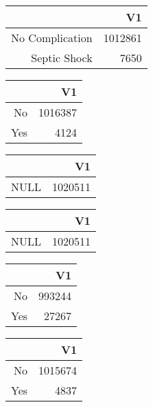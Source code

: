 \bigskip\bigskip
\centering
\begin{tabular}{rr}
  \hline
 & V1 \\ 
  \hline
No Complication & 1012861 \\ 
  Septic Shock & 7650 \\ 
   \hline
\end{tabular}

\bigskip\bigskip
\centering
\begin{tabular}{rr}
  \hline
 & V1 \\ 
  \hline
No & 1016387 \\ 
  Yes & 4124 \\ 
   \hline
\end{tabular}

\bigskip\bigskip
\centering
\begin{tabular}{rr}
  \hline
 & V1 \\ 
  \hline
NULL & 1020511 \\ 
   \hline
\end{tabular}

\bigskip\bigskip
\centering
\begin{tabular}{rr}
  \hline
 & V1 \\ 
  \hline
NULL & 1020511 \\ 
   \hline
\end{tabular}

\bigskip\bigskip
\centering
\begin{tabular}{rr}
  \hline
 & V1 \\ 
  \hline
No & 993244 \\ 
  Yes & 27267 \\ 
   \hline
\end{tabular}

\bigskip\bigskip
\centering
\begin{tabular}{rr}
  \hline
 & V1 \\ 
  \hline
No & 1015674 \\ 
  Yes & 4837 \\ 
   \hline
\end{tabular}

